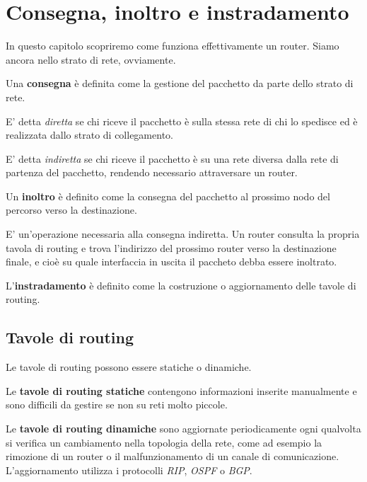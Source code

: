 \section{Consegna, inoltro e instradamento}

    In questo capitolo scopriremo come funziona effettivamente un router. Siamo ancora nello strato di rete, ovviamente.
    
    \vspace{3mm}
    
    Una \textbf{consegna} è definita come la gestione del pacchetto da parte dello strato di rete. 
    
    E' detta \textit{diretta} se chi riceve il pacchetto è sulla stessa rete di chi lo spedisce ed è realizzata dallo strato di collegamento. 
    
    E' detta \textit{indiretta} se chi riceve il pacchetto è su una rete diversa dalla rete di partenza del pacchetto, rendendo necessario attraversare un router.
    
    \vspace{3mm}
    
    Un \textbf{inoltro} è definito come la consegna del pacchetto al prossimo nodo del percorso verso la destinazione. 
    
    E' un'operazione necessaria alla consegna indiretta. Un router consulta la propria tavola di routing e trova l'indirizzo del prossimo router verso la destinazione finale, e cioè su quale interfaccia in uscita il paccheto debba essere inoltrato.
    
    \vspace{3mm}
    
    L'\textbf{instradamento} è definito come la costruzione o aggiornamento delle tavole di routing.
    
    \subsection{Tavole di routing}
    
        Le tavole di routing possono essere statiche o dinamiche.
        
        \vspace{3mm}
        
        Le \textbf{tavole di routing statiche} contengono informazioni inserite manualmente e sono difficili da gestire se non su reti molto piccole.
        
        Le \textbf{tavole di routing dinamiche} sono aggiornate periodicamente ogni qualvolta si verifica un cambiamento nella topologia della rete, come ad esempio la rimozione di un router o il malfunzionamento di un canale di comunicazione. L'aggiornamento utilizza i protocolli \textit{RIP}, \textit{OSPF} o \textit{BGP}.
        
